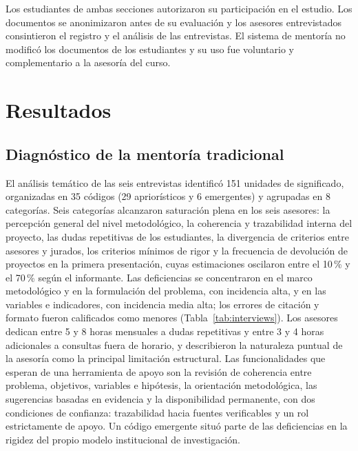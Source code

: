 \documentclass[journal]{IEEEtran}
\begin{document}
Los estudiantes de ambas secciones autorizaron su participación en el estudio. Los documentos se anonimizaron antes de su evaluación y los asesores entrevistados consintieron el registro y el análisis de las entrevistas. El sistema de mentoría no modificó los documentos de los estudiantes y su uso fue voluntario y complementario a la asesoría del curso.

\section{Resultados}

\subsection{Diagnóstico de la mentoría tradicional}

El análisis temático de las seis entrevistas identificó 151 unidades de significado, organizadas en 35 códigos (29 apriorísticos y 6 emergentes) y agrupadas en 8 categorías. Seis categorías alcanzaron saturación plena en los seis asesores: la percepción general del nivel metodológico, la coherencia y trazabilidad interna del proyecto, las dudas repetitivas de los estudiantes, la divergencia de criterios entre asesores y jurados, los criterios mínimos de rigor y la frecuencia de devolución de proyectos en la primera presentación, cuyas estimaciones oscilaron entre el 10\,\% y el 70\,\% según el informante. Las deficiencias se concentraron en el marco metodológico y en la formulación del problema, con incidencia alta, y en las variables e indicadores, con incidencia media alta; los errores de citación y formato fueron calificados como menores (Tabla~\ref{tab:interviews}). Los asesores dedican entre 5 y 8 horas mensuales a dudas repetitivas y entre 3 y 4 horas adicionales a consultas fuera de horario, y describieron la naturaleza puntual de la asesoría como la principal limitación estructural. Las funcionalidades que esperan de una herramienta de apoyo son la revisión de coherencia entre problema, objetivos, variables e hipótesis, la orientación metodológica, las sugerencias basadas en evidencia y la disponibilidad permanente, con dos condiciones de confianza: trazabilidad hacia fuentes verificables y un rol estrictamente de apoyo. Un código emergente situó parte de las deficiencias en la rigidez del propio modelo institucional de investigación.
\end{document}
